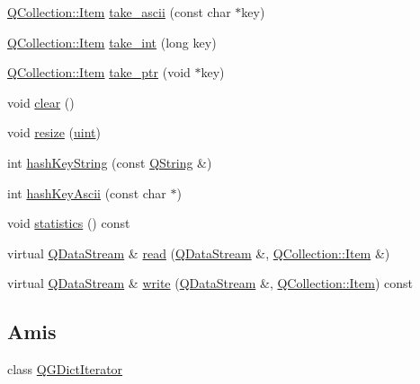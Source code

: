 \begin{DoxyCompactItemize}
\item 
\hyperlink{class_q_collection_ac6f3ddbf999e31fb797927f71ae6b5d7}{Q\+Collection\+::\+Item} \hyperlink{class_q_g_dict_a63d62bbf56ae87af66f3c6c61b8c5bf7}{take\+\_\+ascii} (const char $\ast$key)
\item 
\hyperlink{class_q_collection_ac6f3ddbf999e31fb797927f71ae6b5d7}{Q\+Collection\+::\+Item} \hyperlink{class_q_g_dict_a1cd50eb19f0817df17350a978aa759d9}{take\+\_\+int} (long key)
\item 
\hyperlink{class_q_collection_ac6f3ddbf999e31fb797927f71ae6b5d7}{Q\+Collection\+::\+Item} \hyperlink{class_q_g_dict_a96016e0d21a045d9901ba45182fdd80f}{take\+\_\+ptr} (void $\ast$key)
\item 
void \hyperlink{class_q_g_dict_a991443b3568622b97772e234fe61dfd7}{clear} ()
\item 
void \hyperlink{class_q_g_dict_a926ff48cc6b011ab9d40dd930c5eb8e7}{resize} (\hyperlink{qglobal_8h_a4d3943ddea65db7163a58e6c7e8df95a}{uint})
\item 
int \hyperlink{class_q_g_dict_ad27652d613a6df366a5135ea8c4a8231}{hash\+Key\+String} (const \hyperlink{class_q_string}{Q\+String} \&)
\item 
int \hyperlink{class_q_g_dict_ad3c9ab38e145042373e329e9ecbf8f25}{hash\+Key\+Ascii} (const char $\ast$)
\item 
void \hyperlink{class_q_g_dict_a42dfdec3983dd7282ad1139ec3397311}{statistics} () const 
\item 
virtual \hyperlink{class_q_data_stream}{Q\+Data\+Stream} \& \hyperlink{class_q_g_dict_a236bd95bec134d7de77c0037b177ca8c}{read} (\hyperlink{class_q_data_stream}{Q\+Data\+Stream} \&, \hyperlink{class_q_collection_ac6f3ddbf999e31fb797927f71ae6b5d7}{Q\+Collection\+::\+Item} \&)
\item 
virtual \hyperlink{class_q_data_stream}{Q\+Data\+Stream} \& \hyperlink{class_q_g_dict_abd974d8861b9cf5a3d3e6c3f89f2f5bb}{write} (\hyperlink{class_q_data_stream}{Q\+Data\+Stream} \&, \hyperlink{class_q_collection_ac6f3ddbf999e31fb797927f71ae6b5d7}{Q\+Collection\+::\+Item}) const 
\end{DoxyCompactItemize}
\subsection*{Amis}
\begin{DoxyCompactItemize}
\item 
class \hyperlink{class_q_g_dict_a2335fdd735e908a9e6f4f32d38da15f4}{Q\+G\+Dict\+Iterator}
\end{DoxyCompactItemize}
